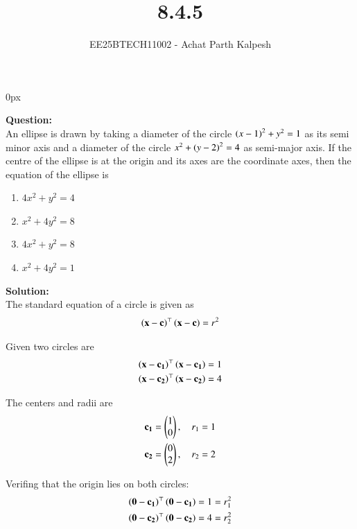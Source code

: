 \documentclass[journal]{IEEEtran}
\begin{document}

\title{8.4.5}
\author{EE25BTECH11002 - Achat Parth Kalpesh }
{\let\newpage\relax\maketitle}
\renewcommand{\thefigure}{\theenumi}
\renewcommand{\thetable}{\theenumi}
\setlength{\intextsep}{10pt} %
\renewcommand{\thetable}{\theenumi}
\parindent 0px



\textbf{Question:}\\
An ellipse is drawn by taking a diameter of the circle $\left(x-1\right)^2+y^2=1$ as its semi minor axis and a diameter of the circle $x^2+\left(y-2\right)^2=4$ as semi-major axis. If the centre of the ellipse is at the origin and its axes are the coordinate axes, then the equation of the ellipse is 
\begin{multicols}{2}
\begin{enumerate}
    \item $4x^2+y^2=4$ 
    \item $x^2+4y^2=8$
    \item $4x^2+y^2=8$
    \item $x^2+4y^2=1$
\end{enumerate}
\end{multicols}

\textbf{Solution:}\\
The standard equation of a circle is given as
\begin{align}
    \left(\mathbf{x}-\mathbf{c}\right)^\top\left(\mathbf{x}-\mathbf{c}\right) = r^2
\end{align}

Given two circles are
\begin{align}
    \left(\mathbf{x}-\mathbf{c_1}\right)^\top\left(\mathbf{x}-\mathbf{c_1}\right) = 1\\
    \left(\mathbf{x}-\mathbf{c_2}\right)^\top\left(\mathbf{x}-\mathbf{c_2}\right) = 4
\end{align}

The centers and radii are
\begin{align}
    \mathbf{c_1} = \begin{pmatrix}1\\0\end{pmatrix}, \quad r_1 = 1\\
    \mathbf{c_2} = \begin{pmatrix}0\\2\end{pmatrix}, \quad r_2 = 2
\end{align}

Verifing that the origin lies on both circles:
\begin{align}
    \left(\mathbf{0}-\mathbf{c_1}\right)^\top\left(\mathbf{0}-\mathbf{c_1}\right) = 1 = r_1^2\\
    \left(\mathbf{0}-\mathbf{c_2}\right)^\top\left(\mathbf{0}-\mathbf{c_2}\right) = 4 = r_2^2
\end{align}
\end{document}
